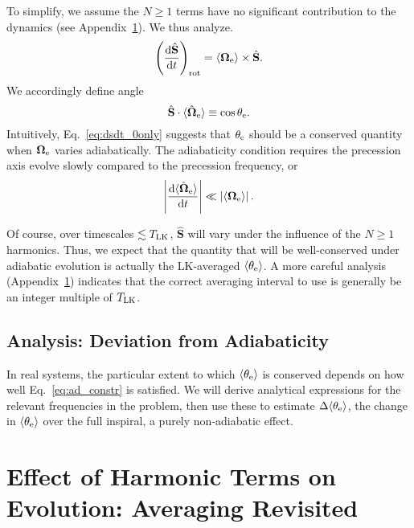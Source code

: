\documentclass[
        fleqn,
        usenatbib,
    ]{mnras}
\newcommand*{\rd}[2]{\frac{\mathrm{d}#1}{\mathrm{d}#2}}
\newcommand*{\abs}[1]{\left|#1\right|}
\newcommand*{\ev}[1]{\langle#1\rangle}
\newcommand*{\bm}[1]{\boldsymbol{\mathbf{#1}}}
\newcommand*{\uv}[1]{\hat{\bm{#1}}}
\newcommand*{\p}[1]{\left(#1\right)}
\begin{document}
To simplify, we assume the $N \geq 1$ terms have no significant contribution to
the dynamics (see Appendix~\ref{s:harmonic}). We thus analyze.
\begin{equation}
    \p{\rd{\uv{S}}{t}}_{\rm rot}
        = \ev{\bm{\Omega}_{\rm e}} \times \uv{S}.\label{eq:dsdt_0only}
\end{equation}
We accordingly define angle
\begin{equation}
    \uv{S} \cdot \ev{\uv{\Omega}_{\rm e}} \equiv \cos \theta_{\rm e}.
\end{equation}
Intuitively, Eq.~\eqref{eq:dsdt_0only} suggests that $\theta_{\rm e}$ should be
a conserved quantity when $\bm{\Omega}_{\rm e}$ varies adiabatically. The
adiabaticity condition requires the precession axis evolve slowly compared to
the precession frequency, or
\begin{equation}
    \abs{\rd{\ev{\uv{\Omega}_{\rm e}}}{t}} \ll
        \abs{\ev{\bm{\Omega}_{\rm e}}}. \label{eq:ad_constr}
\end{equation}

Of course, over timescales $\lesssim T_{\rm LK}$, $\uv{S}$ will vary under the
influence of the $N \geq 1$ harmonics. Thus, we expect that the quantity that
will be well-conserved under adiabatic evolution is actually the LK-averaged
$\ev{\theta_{\rm e}}$. A more careful analysis (Appendix~\ref{s:harmonic})
indicates that the correct averaging interval to use is generally be an integer
multiple of $T_{\rm LK}$.

\subsection{Analysis: Deviation from Adiabaticity}

In real systems, the particular extent to which $\ev{\theta_{\rm e}}$ is
conserved depends on how well Eq.~\eqref{eq:ad_constr} is satisfied. We will
derive analytical expressions for the relevant frequencies in the problem, then
use these to estimate $\Delta \ev{\theta_{\rm e}}$, the change in
$\ev{\theta_{\rm e}}$ over the full inspiral, a purely non-adiabatic effect.




\clearpage
\onecolumn
\appendix

\section{Effect of Harmonic Terms on Evolution: Averaging Revisited
}\label{s:harmonic}
\end{document}
